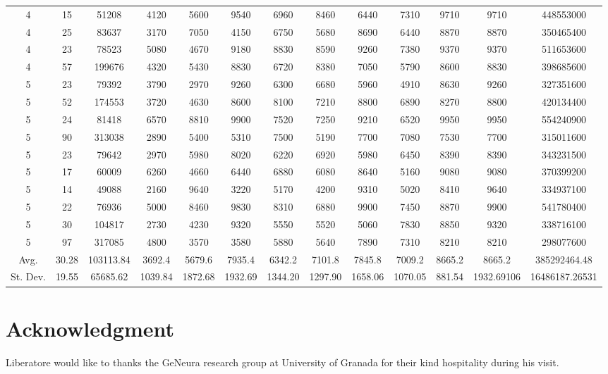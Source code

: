 \documentclass[journal]{IEEEtran}
\begin{document}
\begin{table}
\begin{tabular}{|ccc|cccccccc|cc|}
4	&	15	&	51208	&	4120	&	5600	&	9540	&	6960	&	8460	&	6440	&	7310	&	9710	&	9710	&	448553000	\\
4	&	25	&	83637	&	3170	&	7050	&	4150	&	6750	&	5680	&	8690	&	6440	&	8870	&	8870	&	350465400	\\
4	&	23	&	78523	&	5080	&	4670	&	9180	&	8830	&	8590	&	9260	&	7380	&	9370	&	9370	&	511653600	\\
4	&	57	&	199676	&	4320	&	5430	&	8830	&	6720	&	8380	&	7050	&	5790	&	8600	&	8830	&	398685600	\\
\hline																				
5	&	23	&	79392	&	3790	&	2970	&	9260	&	6300	&	6680	&	5960	&	4910	&	8630	&	9260	&	327351600	\\
5	&	52	&	174553	&	3720	&	4630	&	8600	&	8100	&	7210	&	8800	&	6890	&	8270	&	8800	&	420134400	\\
5	&	24	&	81418	&	6570	&	8810	&	9900	&	7520	&	7250	&	9210	&	6520	&	9950	&	9950	&	554240900	\\
5	&	90	&	313038	&	2890	&	5400	&	5310	&	7500	&	5190	&	7700	&	7080	&	7530	&	7700	&	315011600	\\
5	&	23	&	79642	&	2970	&	5980	&	8020	&	6220	&	6920	&	5980	&	6450	&	8390	&	8390	&	343231500	\\
5	&	17	&	60009	&	6260	&	4660	&	6440	&	6880	&	6080	&	8640	&	5160	&	9080	&	9080	&	370399200	\\
5	&	14	&	49088	&	2160	&	9640	&	3220	&	5170	&	4200	&	9310	&	5020	&	8410	&	9640	&	334937100	\\
5	&	22	&	76936	&	5000	&	8460	&	9830	&	8310	&	6880	&	9900	&	7450	&	8870	&	9900	&	541780400	\\
5	&	30	&	104817	&	2730	&	4230	&	9320	&	5550	&	5520	&	5060	&	7830	&	8850	&	9320	&	338716100	\\
5	&	97	&	317085	&	4800	&	3570	&	3580	&	5880	&	5640	&	7890	&	7310	&	8210	&	8210	&	298077600	\\
\hline																				
Avg.	&	30.28	&	103113.84	&	3692.4	&	5679.6	&	7935.4	&	6342.2	&	7101.8	&	7845.8	&	7009.2	&	8665.2	&	8665.2	&	385292464.48	\\
St. Dev.	&	19.55	&	65685.62	&	1039.84	&	1872.68	&	1932.69	&	1344.20	&	1297.90	&	1658.06	&	1070.05	&	881.54	&	1932.69106	&	16486187.26531	\\
\hline																				
\end{tabular}
\end{table}


\section*{Acknowledgment}
Liberatore would like to thanks the GeNeura research group at
University of Granada for their kind hospitality during his visit.
\end{document}
